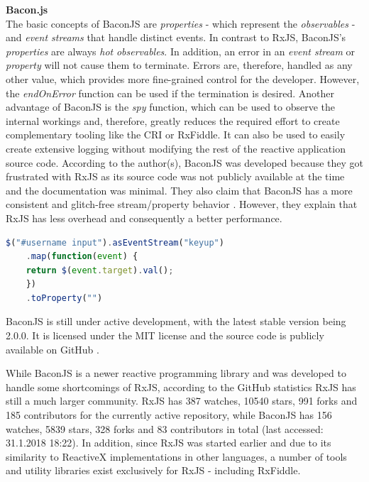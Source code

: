	\noindent\textbf{Bacon.js}\\
	The basic concepts of BaconJS \cite{BaconJS} are \emph{properties} - which represent the \emph{observables} - and \emph{event streams} that handle distinct events. 
	In contrast to RxJS, BaconJS's \emph{properties} are always \emph{hot} \emph{observables}. In addition, an error in an \emph{event stream} or \emph{property} will not cause them to terminate. Errors are, therefore, handled as any other value, which provides more fine-grained control for the developer. However, the \emph{endOnError} function can be used if the termination is desired. 
	Another advantage of BaconJS is the \emph{spy} function, which can be used to observe the internal workings and, therefore, greatly reduces the required effort to create complementary tooling like the CRI or RxFiddle. It can also be used to easily create extensive logging without modifying the rest of the reactive application source code. According to the author(s), BaconJS was developed because they got frustrated with RxJS as its source code was not publicly available at the time and the documentation was minimal. They also claim that BaconJS has a more consistent and glitch-free stream/property behavior \cite{BaconJSRepo}. However, they explain that RxJS has less overhead and consequently a better performance. 
		\begin{lstlisting}[language=JavaScript, caption={Example of BaconJS code.},label={lst:Bacon}]
	$("#username input").asEventStream("keyup")
	.map(function(event) {
	return $(event.target).val();
	})
	.toProperty("")
	\end{lstlisting}
	BaconJS is still under active development, with the latest stable version being 2.0.0. It is licensed under the MIT license and the source code is publicly available on GitHub \cite{BaconJSRepo}.

	While BaconJS is a newer reactive programming library and was developed to handle some shortcomings of RxJS, according to the GitHub statistics RxJS has still a much larger community. RxJS has 387 watches, 10540 stars, 991 forks and 185 contributors for the currently active repository, while BaconJS has 156 watches, 5839 stars, 328 forks and 83 contributors in total (last accessed: 31.1.2018 18:22).
	In addition, since RxJS was started earlier and due to its similarity to ReactiveX implementations in other languages, a number of tools and utility libraries exist exclusively for RxJS - including RxFiddle.

